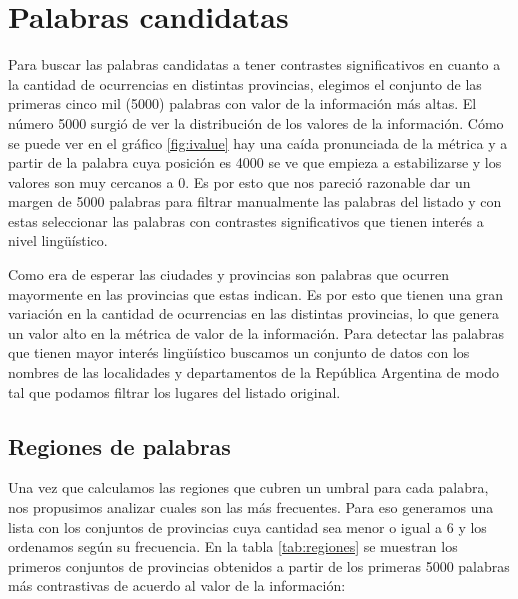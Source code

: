 
\section{Palabras candidatas} %
\label{palabras_candidatas}
Para buscar las palabras candidatas a tener contrastes significativos en cuanto a la cantidad de ocurrencias en distintas provincias, elegimos el conjunto de las primeras 
cinco mil (5000) palabras con valor de la información más altas. El número 5000 surgió de ver la distribución de los valores de la información. Cómo se puede ver en 
el gráfico \ref{fig:ivalue} hay una caída pronunciada de la métrica y a partir de la palabra cuya posición es 4000 se ve que empieza a estabilizarse y los valores son 
muy cercanos a 0. Es por esto que nos pareció razonable dar un margen de 5000 palabras para filtrar manualmente las palabras del listado y con estas seleccionar las palabras con contrastes significativos que tienen interés a nivel lingüístico.

Como era de esperar las ciudades y provincias son palabras que ocurren mayormente en las provincias que estas indican. Es por esto que tienen una gran variación en 
la cantidad de ocurrencias en las distintas provincias, lo que genera un valor alto en la métrica de valor de la información. Para detectar las palabras que tienen 
mayor interés lingüístico buscamos un conjunto de datos con los nombres de las localidades y departamentos de la República Argentina de modo tal que podamos filtrar 
los lugares del listado original.


\subsection{Regiones de palabras} %
\label{sub:regiones_de_palabras}

Una vez que calculamos las regiones que cubren un umbral para cada palabra, nos propusimos analizar cuales son las más frecuentes. Para eso generamos una lista con los conjuntos de provincias cuya cantidad sea menor o igual a 6 y los ordenamos según su frecuencia. En la tabla \ref{tab:regiones} se muestran los primeros conjuntos de provincias obtenidos a partir de los primeras 5000 palabras más contrastivas de acuerdo al valor de la información:

